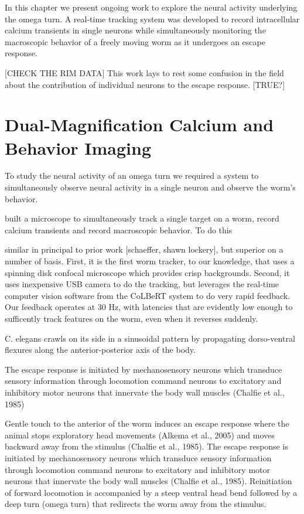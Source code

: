 In this chapter we present ongoing work to explore the neural activity underlying the omega turn. A real-time tracking system was developed to record intracellular calcium transients in single neurons while simultaneously monitoring the macroscopic behavior of a freely moving worm as it undergoes an escape response.

[CHECK THE RIM DATA] This work lays to rest some confusion in the field about the contribution of individual neurons to the escape response.  [TRUE?]

 

\section{Dual-Magnification Calcium and Behavior Imaging}
To study the neural activity of an omega turn we required a system to simultaneously observe neural activity in a single neuron and observe the worm's behavior. 

built a microscope to simultaneously track a single target on a worm, record calcium transients and record macroscopic behavior. To do this 

similar in principal to prior work [schaeffer, shawn lockery], but superior on a number of basis. First, it is the first worm tracker, to our knowledge, that uses a  spinning disk confocal microscope which provides crisp backgrounds. Second, it uses inexpensive USB camera to do the tracking, but leverages the real-time computer vision software from the CoLBeRT system to do very rapid feedback. Our feedback operates at 30 Hz, with latencies that are evidently low enough to sufficently track features on the worm, even when it reverses suddenly. 










C. elegans crawls on its side in a sinusoidal pattern by propagating dorso-ventral flexures along the anterior-posterior axis of the body.  


 The escape response is initiated by mechanosensory neurons which transduce sensory information through locomotion command neurons to excitatory and inhibitory motor neurons that innervate the body wall muscles (Chalfie et al., 1985)



Gentle touch to the anterior of the worm induces an escape response where the animal stops exploratory head movements (Alkema et al., 2005) and moves backward away from the stimulus (Chalfie et al., 1985).  The escape response is initiated by mechanosensory neurons which transduce sensory information through locomotion command neurons to excitatory and inhibitory motor neurons that innervate the body wall muscles (Chalfie et al., 1985).  Reinitiation of forward locomotion is accompanied by a steep ventral head bend followed by a deep turn (omega turn) that redirects the worm away from the stimulus.  


